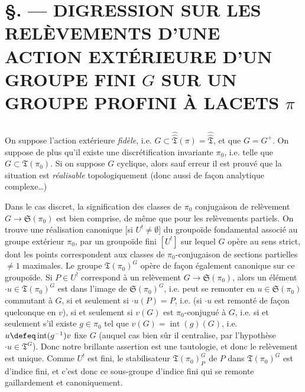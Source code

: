 

\chapter*{\S {}. --- DIGRESSION SUR LES RELÈVEMENTS D'UNE ACTION EXTÉRIEURE D'UN GROUPE FINI $G$ SUR UN GROUPE PROFINI À LACETS $\pi$}\thispagestyle{empty}
\label{sec:31}
\section*{}

On suppose l'action extérieure \emph{fidèle}, i.e. $G \subset \hat{\hat{\mathfrak{T}}} (\pi)=\hat{\hat{\mathfrak{T}}}$, et que $G = G^+$.  On suppose de plus qu'il existe une discrétification invariante $\pi_0$, i.e. telle que $G\subset \mathfrak{T}(\pi_0)$.  Si on suppose $G$ cyclique, alors sauf erreur il est prouvé que la situation est \emph{réalisable} topologiquement (donc aussi de fa\c{c}on analytique complexe\dots)

Dans le cas discret, la signification des classes de $\pi_0$ conjugaison de relèvement $G \to \mathfrak{S}(\pi_0)$ est bien comprise, de même que pour les relèvements partiels. On trouve une réalisation canonique [si $U^!\ne\emptyset$] du groupoïde fondamental associé au groupe extérieur $\pi_0$, par un groupoïde fini $[U^!]$ sur lequel $G$ opère au sens strict, dont les points correspondent aux classes de $\pi_0$-conjugaison de sections partielles $\ne 1$ maximales.  Le groupe $\mathfrak{T}(\pi_0)^G$ opère de fa\c con également canonique sur ce groupoïde. Si $P \in U^!$ correspond à un relèvement $G\to\mathfrak{S}(\pi_0)$, alors un élément $\cdot u\in\mathfrak{T}(\pi_0)^G$ est dans l'image de $\mathfrak{S}(\pi_0)^G$, i.e. peut se remonter en $u\in\mathfrak{S}(\pi_0)$ commutant à $G$, si et seulement si $\cdot u(P)=P$, i.e. (si $\cdot u$ est remonté de fa\c{c}on quelconque en $v$), si et seulement si $v(G)$ est $\pi_0$-conjugué à $G$, i.e. si et seulement s'il existe $g\in\pi_0$ tel que $v(G)= \operatorname{int}(g)(G)$, i.e. $u \defeq \operatorname{int}(g^{-1})v$ fixe $G$ (auquel cas bien sûr il centralise, par l'hypothèse $\cdot u \in \mathfrak{T}^G$). Donc notre brillante assertion est une tautologie, et donc le relèvement est unique. Comme $U^!$ est fini, le stabilisateur $\mathfrak{T}(\pi_0)^G_P$ de $P$ dans $\mathfrak{T}(\pi_0)^G$ est d'indice fini, et c'est donc ce sous-groupe d'indice fini qui se remonte gaillardement et canoniquement.

